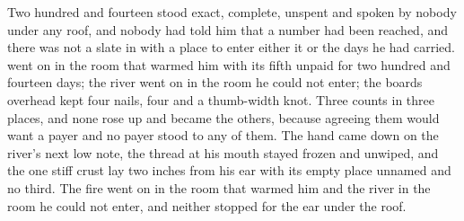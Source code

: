 Two hundred and fourteen stood exact, complete, unspent and spoken by nobody under any roof, and nobody had told him that a number had been reached, and there was not a slate in  with a place to enter either it or the days he had carried.  went on in the room that warmed him with its fifth unpaid for two hundred and fourteen days; the river went on in the room he could not enter; the boards overhead kept four nails, four and a thumb-width knot. Three counts in three places, and none rose up and became the others, because agreeing them would want a payer and no payer stood to any of them. The hand came down on the river's next low note, the thread at his mouth stayed frozen and unwiped, and the one stiff crust lay two inches from his ear with its empty place unnamed and no third. The fire went on in the room that warmed him and the river in the room he could not enter, and neither stopped for the ear under the roof.
